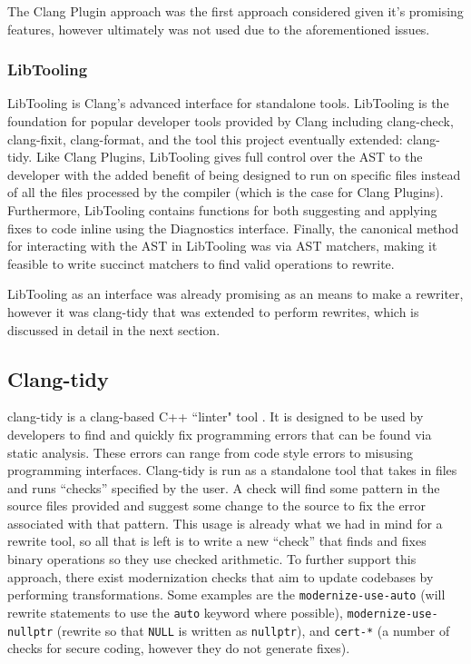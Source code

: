 The Clang Plugin approach was the first approach considered given it's promising features, however ultimately was not used due to the aforementioned issues.

\subsubsection{LibTooling}

LibTooling is Clang's advanced interface for standalone tools. LibTooling is the foundation for popular developer tools provided by Clang including clang-check, clang-fixit, clang-format, and the tool this project eventually extended: clang-tidy. Like Clang Plugins, LibTooling gives full control over the AST to the developer with the added benefit of being designed to run on specific files instead of all the files processed by the compiler (which is the case for Clang Plugins). Furthermore, LibTooling contains functions for both suggesting and applying fixes to code inline using the Diagnostics interface. Finally, the canonical method for interacting with the AST in LibTooling was via AST matchers, making it feasible to write succinct matchers to find valid operations to rewrite.

LibTooling as an interface was already promising as an means to make a rewriter, however it was clang-tidy that was extended to perform rewrites, which is discussed in detail in the next section.

\subsection{Clang-tidy}

clang-tidy is a clang-based C++ ``linter" tool \cite{clang-tidy}. It is designed to be used by developers to find and quickly fix programming errors that can be found via static analysis. These errors can range from code style errors to misusing programming interfaces. Clang-tidy is run as a standalone tool that takes in files and runs ``checks'' specified by the user. A check will find some pattern in the source files provided and suggest some change to the source to fix the error associated with that pattern. This usage is already what we had in mind for a rewrite tool, so all that is left is to write a new ``check'' that finds and fixes binary operations so they use checked arithmetic. To further support this approach, there exist modernization checks that aim to update codebases by performing transformations. Some examples are the \texttt{modernize-use-auto} (will rewrite statements to use the \texttt{auto} keyword where possible), \texttt{modernize-use-nullptr} (rewrite so that \texttt{NULL} is written as \texttt{nullptr}), and \texttt{cert-*} (a number of checks for secure coding, however they do not generate fixes).

